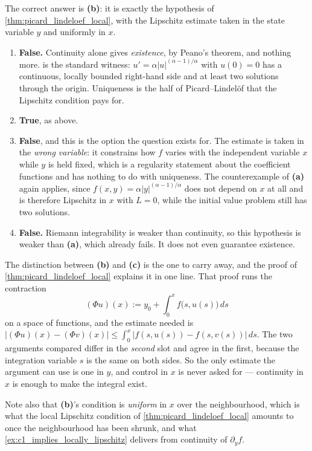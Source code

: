 \begin{exercisesolution}
The correct answer is \textbf{(b)}: it is exactly the hypothesis of
\cref{thm:picard_lindeloef_local}, with the Lipschitz estimate taken in the state variable $y$ and
uniformly in $x$.
\begin{enumerate}[label=\textbf{(\alph*)}]
  \item \textbf{False.} Continuity alone gives \emph{existence}, by Peano's theorem, and nothing
    more.  is the standard witness: $u' =
    \alpha\lvert u\rvert^{(\alpha-1)/\alpha}$ with $u(0)=0$ has a continuous, locally bounded
    right-hand side and at least two solutions through the origin. Uniqueness is the half of
    Picard--Lindel\"of that the Lipschitz condition pays for.
  \item \textbf{True}, as above.
  \item \textbf{False}, and this is the option the question exists for. The estimate is taken in
    the \emph{wrong variable}: it constrains how $f$ varies with the independent variable $x$
    while $y$ is held fixed, which is a regularity statement about the coefficient functions and
    has nothing to do with uniqueness. The counterexample of \textbf{(a)} again applies, since
    $f(x,y) = \alpha\lvert y\rvert^{(\alpha-1)/\alpha}$ does not depend on $x$ at all and is
    therefore Lipschitz in $x$ with $L=0$, while the initial value problem still has two
    solutions.
  \item \textbf{False.} Riemann integrability is weaker than continuity, so this hypothesis is
    weaker than \textbf{(a)}, which already fails. It does not even guarantee existence.
\end{enumerate}
\begin{remark}
\label{rem:lipschitz_in_the_state_variable}
The distinction between \textbf{(b)} and \textbf{(c)} is the one to carry away, and the proof of
\cref{thm:picard_lindeloef_local} explains it in one line. That proof runs the contraction
\[(\Phi u)(x) := y_0 + \int_0^x f\big(s,u(s)\big)\,ds\]
on a space of functions, and the estimate needed is
$\lvert (\Phi u)(x) - (\Phi v)(x)\rvert \le \int_0^x \lvert f(s,u(s)) - f(s,v(s))\rvert\,ds$. The
two arguments compared differ in the \emph{second} slot and agree in the first, because the
integration variable $s$ is the same on both sides. So the only estimate the argument can use is
one in $y$, and control in $x$ is never asked for --- continuity in $x$ is enough to make the
integral exist.

Note also that \textbf{(b)}'s condition is \emph{uniform} in $x$ over the neighbourhood, which is
what the local Lipschitz condition of \cref{thm:picard_lindeloef_local} amounts to once the
neighbourhood has been shrunk, and what \cref{ex:c1_implies_locally_lipschitz} delivers from
continuity of $\partial_yf$.
\end{remark}
\end{exercisesolution}


